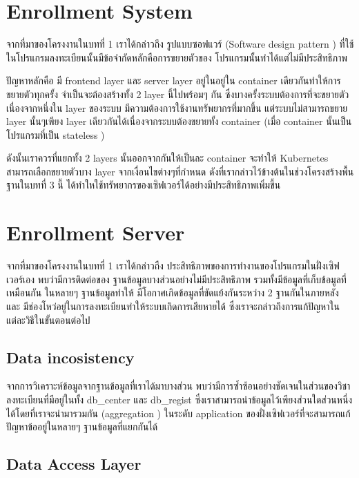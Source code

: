 \section {Enrollment System}

จากที่มาของโครงงานในบทที่ 1 เราได้กล่าวถึง รูปแบบซอฟแวร์ (Software design pattern \cite{sdp}) ที่ใช้ในโปรแกรมลงทะเบียนนั้นมีข้อจำกัดหลักคือการขยายตัวของ โปรแกรมนั้นทำได้แต่ไม่มีประสิทธิภาพ

ปัญหาหลักคือ มี frontend layer และ server layer อยู่ในอยู่ใน container เดียวกันทำให้การขยายตัวทุกครั้ง จำเป็นจะต้องสร้างทั้ง 2 layer นี้ไปพร้อมๆ กัน ซึ่งบางครั้งระบบต้องการที่จะขยายตัวเนื่องจากหนึ่งใน layer ของระบบ มีความต้องการใช้งานทรัพยากรที่มากขึ้น แต่ระบบไม่สามารถขยาย layer นั้นๆเพียง layer เดียวกันได้เนื่องจากระบบต้องขยายทั้ง container (เมื่อ container นั้นเป็นโปรแกรมที่เป็น stateless \cite{slsf})

ดังนั้นเราควรที่แยกทั้ง 2 layers นั้นออกจากกันให้เป็นละ container จะทำให้ Kubernetes สามารถเลือกขยายตัวบาง layer จากเงื่อนไขต่างๆที่กำหนด ดังที่เรากล่าวไว้ข้างต้นในช่วงโครงสร้างพื้นฐานในบทที่ 3 นี้ ได้ทำใหใช้ทรัพยากรของเซิฟเวอร์ได้อย่างมีประสิทธิภาพเพิ่มขึ้น

\section{Enrollment Server}

จากที่มาของโครงงานในบทที่ 1 เราได้กล่าวถืง ประสิทธิภาพของการทำงานของโปรแกรมในฝั่งเซิฟเวอร์เอง พบว่ามีการติดต่อของ ฐานข้อมูลบางส่วนอย่างไม่มีประสิทธิภาพ รวมทั้งมีข้อมูลที่เก็บข้อมูลที่เหมือนกัน ในหลายๆ ฐานข้อมูลทำให้ มีโอกาศเกิดข้อมูลที่ขัดแย้งกันระหว่าง 2 ฐานกันในภายหลัง และ มีช่องโหว่อยู่ในการลงทะเบียนทำให้ระบบเกิดการเสียหายได้ ซึ่งเราจะกล่าวถึงการแก้ปัญหาในแต่ละวิธีในขั้นตอนต่อไป

\subsection{Data incosistency}

จากการวิเคราะห์ข้อมูลจากฐานข้อมูลที่เราได้มาบางส่วน พบว่ามีการซ้ำซ้อนอย่างชัดเจนในส่วนของวิชาลงทะเบียนที่มีอยู่ในทั้ง db\_center และ db\_regist ซึ่งเราสามารถนำข้อมูลไว้เพียงส่วนใดส่วนหนึ่งได้โดยที่เราจะนำมารวมกัน (aggregation \cite{aggregation}) ในระดับ application ของฝั่งเซิฟเวอร์ที่จะสามารถแก้ปัญหาข้ออยู่ในหลายๆ ฐานข้อมูลที่แยกกันได้

\subsection{Data Access Layer}

